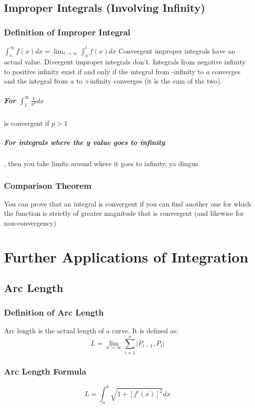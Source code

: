 \documentclass[a4paper,12pt]{report}
\begin{document}
\section{Improper Integrals (Involving Infinity)}
\subsection{Definition of Improper Integral}
$\int_{a}^{\infty} f(x) dx = \lim_{t \to \infty} \int_a^t f(x) dx $
Convergent improper integrals have an actual value. Divergent improper integrals don't.
Integrals from negative infinity to positive infinity exist if and only if the integral from -infinity to $a$ converges and the integral from $a$ to +infinity converges (it is the sum of the two).

\paragraph{For $\int_1^{\infty} \frac{1}{x^p} dx$} is convergent if $p > 1$

\paragraph{For integrals where the y value goes to infinity}, then you take limits around where it goes to infinity, ya dingus.

\subsection{Comparison Theorem}
You can prove that an integral is convergent if you can find another one for which the function is strictly of greater magnitude that is convergent (and likewise for non-convergency)

\chapter{Further Applications of Integration}
\section{Arc Length}
\subsection{Definition of Arc Length}
Arc length is the actual length of a curve. It is defined as: $$L = \lim_{n \to \infty} \sum_{i = 1}^{n} |P_{i-1},P_i|$$

\subsection{Arc Length Formula}
$$L = \int_a^b \sqrt{1 + [f'(x)]^2} dx $$
\end{document}
